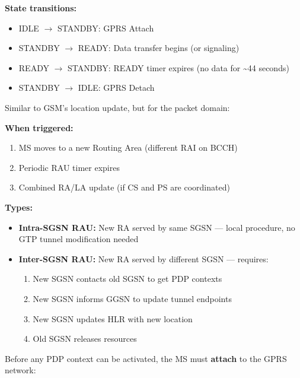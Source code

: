 \textbf{State transitions:}

\begin{itemize}
\tightlist
\item
  IDLE \ensuremath{\to} STANDBY: GPRS Attach
\item
  STANDBY \ensuremath{\to} READY: Data transfer begins (or signaling)
\item
  READY \ensuremath{\to} STANDBY: READY timer expires (no data for \textasciitilde{}44 seconds)
\item
  STANDBY \ensuremath{\to} IDLE: GPRS Detach
\end{itemize}


Similar to GSM’s location update, but for the packet domain:

\textbf{When triggered:}

\begin{enumerate}
\def\labelenumi{\arabic{enumi}.}
\tightlist
\item
  MS moves to a new Routing Area (different RAI on BCCH)
\item
  Periodic RAU timer expires
\item
  Combined RA/\allowbreak{}LA update (if CS and PS are coordinated)
\end{enumerate}

\textbf{Types:}

\begin{itemize}
\tightlist
\item
  \textbf{Intra-SGSN RAU:} New RA served by same SGSN — local procedure, no GTP tunnel modification needed
\item
  \textbf{Inter-SGSN RAU:} New RA served by different SGSN — requires:

  \begin{enumerate}
  \def\labelenumi{\arabic{enumi}.}
  \tightlist
  \item
    New SGSN contacts old SGSN to get PDP contexts
  \item
    New SGSN informs GGSN to update tunnel endpoints
  \item
    New SGSN updates HLR with new location
  \item
    Old SGSN releases resources
  \end{enumerate}
\end{itemize}


Before any PDP context can be activated, the MS must \textbf{attach} to the GPRS network:

